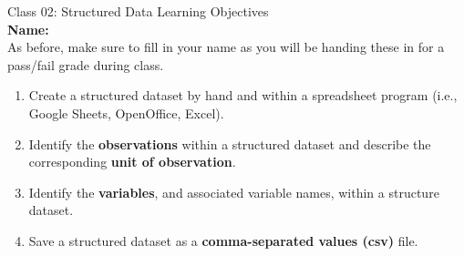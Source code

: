 \documentclass[11pt]{article}
\date{2018-07-01}                                           %
\begin{document}
{\Large \textcolor{oiB}{
Class 02: Structured Data
\hfill Learning Objectives}} \\

\textbf{Name:} \underline{\hspace{6cm}} \\

As before, make sure to fill in your name as you will be handing these in for a
pass/fail grade during class.

\vspace{0.2cm}

\begin{enumerate}
\renewcommand\labelenumi{\textcolor{light}{\textbf{LO \theenumi.}}}

\item Create a structured dataset by hand and within a spreadsheet program
(i.e., Google Sheets, OpenOffice, Excel). 

\item Identify the \textbf{observations} within a structured dataset and 
describe the corresponding \textbf{unit of observation}.

\item Identify the \textbf{variables}, and associated variable names, within a
structure dataset.

\item Save a structured dataset as a \textbf{comma-separated values (csv)}
file. 

\end{enumerate}

\noindent\makebox[\linewidth]{\rule{1.1\textwidth}{0.4pt}}
\end{document}
